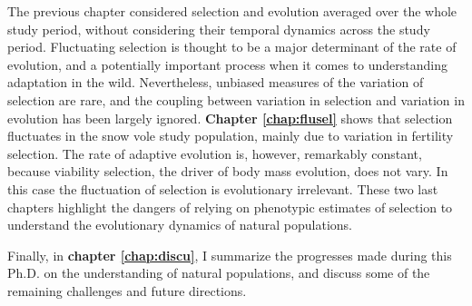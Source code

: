 The previous chapter considered selection and evolution averaged over the whole study period, without considering their temporal dynamics across the study period. Fluctuating selection is thought to be a major determinant of the rate of evolution, and a potentially important process when it comes to understanding adaptation in the wild. 
Nevertheless, unbiased measures of the variation of selection are rare, and the coupling between variation in selection and variation in evolution has been largely ignored. \textbf{Chapter \ref{chap:flusel}} shows that selection fluctuates in the snow vole study population, mainly due to variation in fertility selection. The rate of adaptive evolution is, however, remarkably constant, because viability selection, the driver of body mass evolution, does not vary. In this case the fluctuation of selection is evolutionary irrelevant. These two last chapters highlight the dangers of relying on phenotypic estimates of selection to understand the evolutionary dynamics of natural populations.

Finally, in \textbf{chapter \ref{chap:discu}}, I summarize the progresses made during this Ph.D. on the understanding of natural populations, and discuss some of the remaining challenges and future directions.


